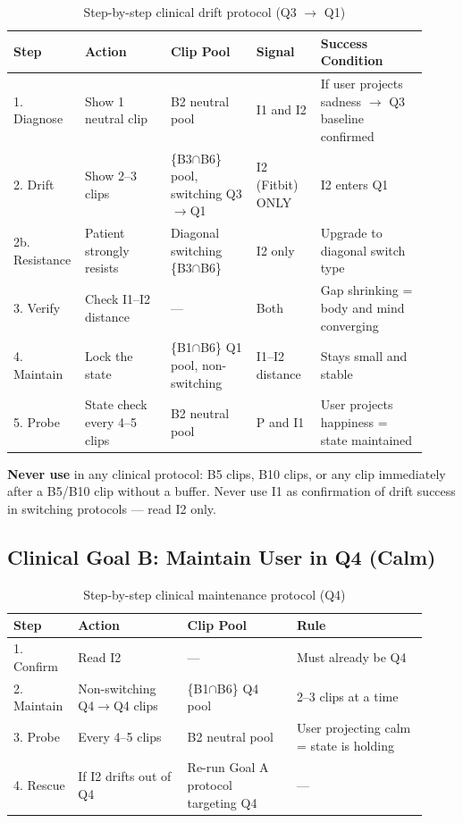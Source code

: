 \documentclass[11pt, a4paper]{report}
\begin{document}
\begin{table}[H]
\centering
\small
\caption{Step-by-step clinical drift protocol (Q3 $\rightarrow$ Q1)}
\begin{tabular}{@{}p{0.12\linewidth}p{0.20\linewidth}p{0.20\linewidth}p{0.15\linewidth}p{0.25\linewidth}@{}}
\toprule
\textbf{Step} & \textbf{Action} & \textbf{Clip Pool} & \textbf{Signal} & \textbf{Success Condition} \\
\midrule
1. Diagnose & Show 1 neutral clip & B2 neutral pool & I1 and I2 & If user projects sadness $\rightarrow$ Q3 baseline confirmed \\
2. Drift & Show 2--3 clips & \{B3$\cap$B6\} pool, switching Q3$\rightarrow$Q1 & I2 (Fitbit) ONLY & I2 enters Q1 \\
2b. Resistance & Patient strongly resists & Diagonal switching \{B3$\cap$B6\} & I2 only & Upgrade to diagonal switch type \\
3. Verify & Check I1--I2 distance & --- & Both & Gap shrinking = body and mind converging \\
4. Maintain & Lock the state & \{B1$\cap$B6\} Q1 pool, non-switching & I1--I2 distance & Stays small and stable \\
5. Probe & State check every 4--5 clips & B2 neutral pool & P and I1 & User projects happiness = state maintained \\
\bottomrule
\end{tabular}
\end{table}

\noindent\textbf{Never use} in any clinical protocol: B5 clips, B10 clips, or any clip immediately after a B5/B10 clip without a buffer. Never use I1 as confirmation of drift success in switching protocols --- read I2 only.

\subsection{Clinical Goal B: Maintain User in Q4 (Calm)}

\begin{table}[H]
\centering
\small
\caption{Step-by-step clinical maintenance protocol (Q4)}
\begin{tabular}{@{}p{0.12\linewidth}p{0.25\linewidth}p{0.25\linewidth}p{0.30\linewidth}@{}}
\toprule
\textbf{Step} & \textbf{Action} & \textbf{Clip Pool} & \textbf{Rule} \\
\midrule
1. Confirm & Read I2 & --- & Must already be Q4 \\
2. Maintain & Non-switching Q4$\rightarrow$Q4 clips & \{B1$\cap$B6\} Q4 pool & 2--3 clips at a time \\
3. Probe & Every 4--5 clips & B2 neutral pool & User projecting calm = state is holding \\
4. Rescue & If I2 drifts out of Q4 & Re-run Goal A protocol targeting Q4 & --- \\
\bottomrule
\end{tabular}
\end{table}
\end{document}
